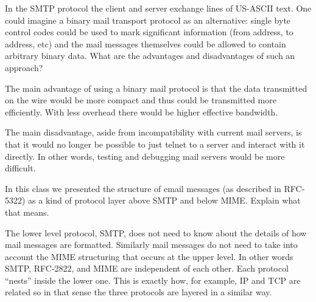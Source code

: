 \documentclass[12pt]{examdesign}
\begin{document}
\begin{shortanswer}

  \begin{question}
    In the SMTP protocol the client and server exchange lines of US-ASCII text. One could
    imagine a binary mail transport protocol as an alternative: single byte control codes could
    be used to mark significant information (from address, to address, etc) and the mail
    messages themselves could be allowed to contain arbitrary binary data. What are the
    advantages and disadvantages of such an approach?

    \begin{answer}
      The main advantage of using a binary mail protocol is that the data transmitted on the
      wire would be more compact and thus could be transmitted more efficiently. With less
      overhead there would be higher effective bandwidth.
      
      The main disadvantage, aside from incompatibility with current mail servers, is that it
      would no longer be possible to just telnet to a server and interact with it directly. In
      other words, testing and debugging mail servers would be more difficult.
    \end{answer}
  \end{question}


  \begin{question}
    In this class we presented the structure of email messages (as described in RFC-5322) as a
    kind of protocol layer above SMTP and below MIME. Explain what that means.

    \begin{answer}
      The lower level protocol, SMTP, does not need to know about the details of how mail
      messages are formatted. Similarly mail messages do not need to take into account the MIME
      structuring that occurs at the upper level. In other words SMTP, RFC-2822, and MIME are
      independent of each other. Each protocol ``nests'' inside the lower one. This is exactly
      how, for example, IP and TCP are related so in that sense the three protocols are layered
      in a similar way.
    \end{answer}
  \end{question}



\end{shortanswer}
\end{document}
